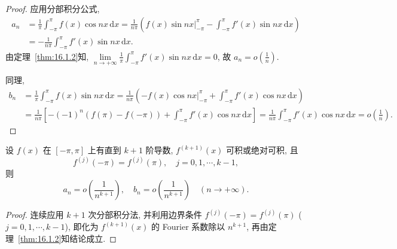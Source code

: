 \begin{proof}
应用分部积分公式,
\[
  \begin{aligned}
    a_{n}&=\frac{1}{\pi}\int_{-\pi}^{\pi}f(x)\cos nx\,\mathrm{d}x=\frac{1}{n\pi}\left(\left.f(x)\sin nx\right|_{-\pi}^{\pi}-\int_{-\pi}^{\pi}f'(x)\sin nx\,\mathrm{d}x\right)\\
    &=-\frac{1}{n\pi}\int_{-\pi}^{\pi}f'(x)\sin nx\,\mathrm{d}x.
  \end{aligned}
\]
由定理~\ref{thm:16.1.2}知, $\lim\limits_{n\to+\infty}\displaystyle\frac{1}{\pi}\int_{-\pi}^{\pi}f'(x)\sin nx\,\mathrm{d}x=0$, 故 $a_{n}=o\left(\frac{1}{n}\right)$.

同理,
\[
  \begin{aligned}
    b_{n}&=\frac{1}{\pi}\int_{-\pi}^{\pi}f(x)\sin nx\,\mathrm{d}x=\frac{1}{n\pi}\left(-\left.f(x)\cos nx\right|_{-\pi}^{\pi}+\int_{-\pi}^{\pi}f'(x)\cos nx\,\mathrm{d}x\right)\\
    &=\frac{1}{n\pi}\left[-(-1)^{n}(f(\pi)-f(-\pi))+\int_{-\pi}^{\pi}f'(x)\cos nx\,\mathrm{d}x\right]=\frac{1}{n\pi}\int_{-\pi}^{\pi}f'(x)\cos nx\,\mathrm{d}x=o\left(\frac{1}{n}\right).
  \end{aligned}
\]
\end{proof}

\begin{theorem}\label{thm:16.1.5}
设 $f(x)$ 在 $[-\pi,\pi]$ 上有直到 $k+1$ 阶导数, $f^{(k+1)}(x)$ 可积或绝对可积, 且
\[
  f^{(j)}(-\pi)=f^{(j)}(\pi),\quad j=0,1,\cdots,k-1,
\]
则
\[
  a_{n}=o\left(\frac{1}{n^{k+1}}\right),\quad b_{n}=o\left(\frac{1}{n^{k+1}}\right)\quad(n\to+\infty).
\]
\end{theorem}

\begin{proof}
连续应用 $k+1$ 次分部积分法, 并利用边界条件 $f^{(j)}(-\pi)=f^{(j)}(\pi)$ ($j=0,1,\cdots,k-1$), 即化为 $f^{(k+1)}(x)$ 的 Fourier 系数除以 $n^{k+1}$, 再由定理~\ref{thm:16.1.2}知结论成立.
\end{proof}

